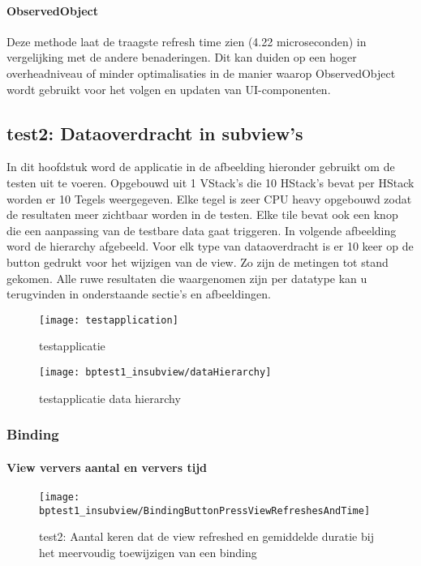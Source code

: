 \paragraph{ObservedObject}
Deze methode laat de traagste refresh time zien (4.22 microseconden) in vergelijking met de andere benaderingen. Dit kan duiden op een hoger overheadniveau of minder optimalisaties in de manier waarop ObservedObject wordt gebruikt voor het volgen en updaten van UI-componenten.


\subsection{test2: Dataoverdracht in subview's}
In dit hoofdstuk word de applicatie in de afbeelding hieronder gebruikt om de testen uit te voeren. Opgebouwd uit 1 VStack's die 10 HStack's bevat per HStack worden er 10 Tegels weergegeven. Elke tegel is zeer CPU heavy opgebouwd zodat de resultaten meer zichtbaar worden in de testen. Elke tile bevat ook een knop die een aanpassing van de testbare data gaat triggeren. In volgende afbeelding word de hierarchy afgebeeld. Voor elk type van dataoverdracht is er 10 keer op de button gedrukt voor het wijzigen van de view. Zo zijn de metingen tot stand gekomen. Alle ruwe resultaten die waargenomen zijn per datatype kan u terugvinden in onderstaande sectie's en afbeeldingen.
\begin{figure}[htbp]
    \centering
    \texttt{[image: testapplication]} 
    \caption{testapplicatie}
    \label{fig:testapplication}
\end{figure}
\begin{figure}[htbp]
    \centering
    \texttt{[image: bptest1\_insubview/dataHierarchy]} 
    \caption{testapplicatie data hierarchy}
    \label{fig:testapplicationHierarchy}
\end{figure}
\subsubsection{Binding}
\paragraph{View ververs aantal en ververs tijd }
\begin{figure}[H]
    \centering
    \texttt{[image: bptest1\_insubview/BindingButtonPressViewRefreshesAndTime]} 
    \caption{test2: Aantal keren dat de view refreshed en gemiddelde duratie bij het meervoudig toewijzigen van een binding}
    \label{fig:viewRefreshesBinding1}
\end{figure}
